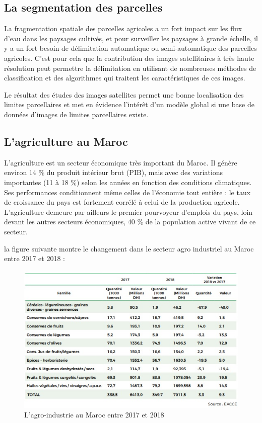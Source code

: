 \documentclass[12pt, openany]{report}
\begin{document}
\subsection{La segmentation des parcelles}

La fragmentation spatiale des parcelles agricoles a un fort impact sur les flux d’eau dans les paysages cultivés, et pour surveiller les paysages à grande échelle, il y a un fort besoin de délimitation automatique ou semi-automatique des parcelles agricoles. C’est pour cela que la contribution des images satellitaires à très haute résolution peut permettre la délimitation en utilisant de nombreuses méthodes de classification et des algorithmes qui traitent les caractéristiques de ces images.\cite{frag}

Le résultat des études des images satellites permet une bonne localisation des limites parcellaires et met en évidence l’intérêt d’un modèle global si une base de données d’images de limites parcellaires existe. 

\subsection{L'agriculture au Maroc}

L'agriculture est un secteur économique très important du Maroc. Il génère environ 14 \% du produit intérieur brut (PIB), mais avec des variations importantes (11 à 18 \%) selon les années en fonction des conditions climatiques. Ses performances conditionnent même celles de l’économie tout entière : le taux de croissance du pays est fortement corrélé à celui de la production agricole. L’agriculture demeure par ailleurs le premier pourvoyeur d’emplois du pays, loin devant les autres secteurs économiques, 40 \% de la population active vivant de ce secteur.\cite{imagesatt}

la figure suivante montre le changement dans le secteur agro industriel au Maroc entre 2017 et 2018 :


\begin{figure}[H]
\centering
\includegraphics[scale=1.2]{agr.jpg}
\caption{L'agro-industrie au Maroc entre 2017 et 2018}
\end{figure}
\end{document}
